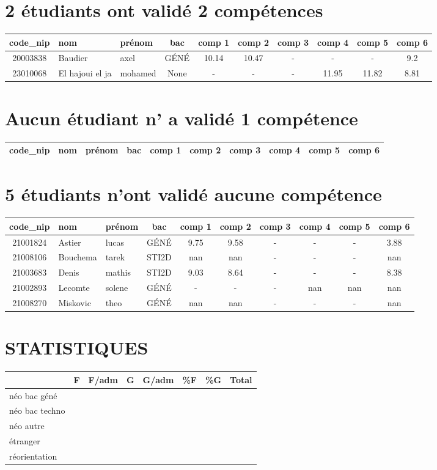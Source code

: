 \documentclass{article}%
\begin{document}
%
\section*{2 étudiants ont validé 2 compétences}%
\label{sec:2tudiantsontvalid2comptences}%
\begin{tabular}{|c|l|l|c|c|c|c|c|c|c|}%
\hline%
\rowcolor{bleu}%
code\_nip&nom&prénom&bac&comp 1&comp 2&comp 3&comp 4&comp 5&comp 6\\%
\hline%
20003838&Baudier&axel&GÉNÉ&10.14&10.47&{-}&{-}&{-}&9.2\\%
\hline%
23010068&El hajoui el ja&mohamed&None&{-}&{-}&{-}&11.95&11.82&8.81\\%
\hline%
\end{tabular}

%
\section*{Aucun étudiant n' a validé 1 compétence}%
\label{sec:Aucuntudiantnavalid1comptence}%
\begin{tabular}{|c|l|l|c|c|c|c|c|c|c|}%
\hline%
\rowcolor{bleu}%
code\_nip&nom&prénom&bac&comp 1&comp 2&comp 3&comp 4&comp 5&comp 6\\%
\hline%
\end{tabular}

%
\section*{5 étudiants n'ont validé aucune compétence}%
\label{sec:5tudiantsnontvalidaucunecomptence}%
\begin{tabular}{|c|l|l|c|c|c|c|c|c|c|}%
\hline%
\rowcolor{bleu}%
code\_nip&nom&prénom&bac&comp 1&comp 2&comp 3&comp 4&comp 5&comp 6\\%
\hline%
21001824&Astier&lucas&GÉNÉ&9.75&9.58&{-}&{-}&{-}&3.88\\%
\hline%
21008106&Bouchema&tarek&STI2D&nan&nan&{-}&{-}&{-}&nan\\%
\hline%
21003683&Denis&mathis&STI2D&9.03&8.64&{-}&{-}&{-}&8.38\\%
\hline%
21002893&Lecomte&solene&GÉNÉ&{-}&{-}&{-}&nan&nan&nan\\%
\hline%
21008270&Miskovic&theo&GÉNÉ&nan&nan&{-}&{-}&{-}&nan\\%
\hline%
\end{tabular}

%
\section*{STATISTIQUES}%
\label{sec:STATISTIQUES}%
\begin{tabular}{|p{1.5cm}|p{1.5cm}|p{1.5cm}|p{1.5cm}|p{1.5cm}|p{1.5cm}|p{1.5cm}|p{1.5cm}|}%
\hline%
&F&F/adm&G&G/adm&\%F&\%G&Total\\%
\hline%
néo bac géné&&&&&&&\\%
\hline%
néo bac techno&&&&&&&\\%
\hline%
néo autre&&&&&&&\\%
\hline%
étranger&&&&&&&\\%
\hline%
réorientation&&&&&&&\\%
\hline%
\end{tabular}

%
\end{document}
